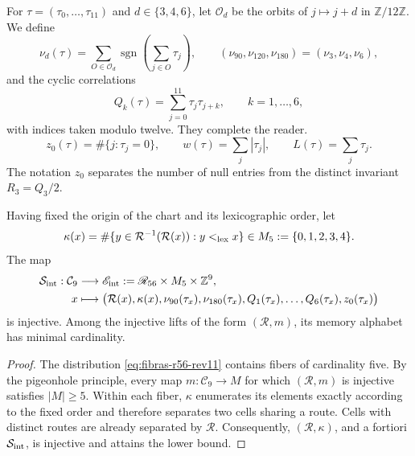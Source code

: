 For \(\tau=(\tau_0,\ldots,\tau_{11})\) and
\(d\in\{3,4,6\}\), let \(\mathcal O_d\) be the orbits of
\(j\mapsto j+d\) in \(\mathbb Z/12\mathbb Z\). We define
\[
 \nu_d(\tau)=
 \sum_{O\in\mathcal O_d}
 \operatorname{sgn}\!\left(\sum_{j\in O}\tau_j\right),
 \qquad
 (\nu_{90},\nu_{120},\nu_{180})=(\nu_3,\nu_4,\nu_6),
\]
and the cyclic correlations
\[
 Q_k(\tau)=\sum_{j=0}^{11}\tau_j\tau_{j+k},
 \qquad k=1,\ldots,6,
\]
with indices taken modulo twelve. They complete the reader.
\[
 z_0(\tau)=\#\{j:\tau_j=0\},\qquad
 w(\tau)=\sum_j|\tau_j|,\qquad
 L(\tau)=\sum_j\tau_j.
\]
The notation \(z_0\) separates the number of null entries from the distinct invariant
\(R_3=Q_3/2\).

\begin{theorem}
\label{thm:selector-interno-minimo-rev11}
Having fixed the origin of the chart and its lexicographic order, let
\[
 \kappa(x)=
 \#\{y\in\mathcal R^{-1}(\mathcal R(x)):y<_{\rm lex}x\}
 \in M_5:=\{0,1,2,3,4\}.
\]
The map
\begin{align}
 \mathcal S_{\rm int}:\mathcal C_9&\longrightarrow
 \mathscr E_{\rm int}:=\mathscr R_{56}\times M_5\times\mathbb Z^9,
 \notag\\
 x&\longmapsto
 \bigl(\mathcal R(x),\kappa(x),\nu_{90}(\tau_x),
 \nu_{180}(\tau_x),Q_1(\tau_x),\ldots,Q_6(\tau_x),z_0(\tau_x)\bigr)
 \label{eq:selector-interno-rev11}
\end{align}
is injective. Among the injective lifts of the form
\((\mathcal R,m)\), its memory alphabet has minimal cardinality.
\end{theorem}

\begin{proof}
The distribution \eqref{eq:fibras-r56-rev11} contains fibers of cardinality five. By the pigeonhole principle, every map \(m:\mathcal C_9\to M\) for which \((\mathcal R,m)\) is injective satisfies \(|M|\geq5\). Within each fiber, \(\kappa\) enumerates its elements exactly according to the fixed order and therefore separates two cells sharing a route. Cells with distinct routes are already separated by \(\mathcal R\). Consequently, \((\mathcal R,\kappa)\), and a fortiori \(\mathcal S_{\rm int}\), is injective and attains the lower bound.
\end{proof}

